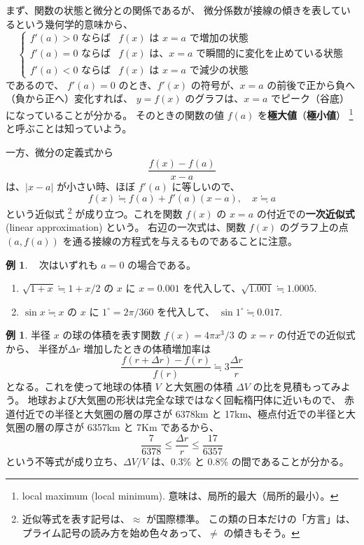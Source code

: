 \documentclass[a4paper]{jsarticle}
\theoremstyle{definition}
\newtheorem{Example}[Theorem]{例}
\theoremstyle{remark}
\begin{document}
まず、関数の状態と微分との関係であるが、
微分係数が接線の傾きを表しているという幾何学的意味から、
\[
\begin{cases}
\text{$f'(a) > 0$ ならば}
&\text{$f(x)$ は $x=a$ で増加の状態}\\
\text{$f'(a) = 0$ ならば}
&\text{$f(x)$ は、$x=a$ で瞬間的に変化を止めている状態}\\
\text{$f'(a) < 0$ ならば}
&\text{$f(x)$ は $x=a$ で減少の状態}
\end{cases}
\]
であるので、
$f'(a) = 0$ のとき、$f'(x)$ の符号が、$x=a$ の前後で正から負へ
（負から正へ）変化すれば、
$y = f(x)$ のグラフは、$x=a$ でピーク（谷底）になっていることが分かる。
そのときの関数の値 $f(a)$ を\textbf{極大値}（\textbf{極小値}）
\footnote{local maximum (local minimum). 意味は、局所的最大（局所的最小）。}と呼ぶことは知っていよう。

一方、微分の定義式から
\[
\frac{f(x) - f(a)}{x-a}
\]
は、$|x-a|$ が小さい時、ほぼ $f'(a)$ に等しいので、
\[
f(x) \fallingdotseq f(a) + f'(a)(x-a), 
\quad 
x \fallingdotseq a
\]
という近似式
\footnote{
近似等式を表す記号は、$\approx$ が国際標準。
この類の日本だけの「方言」は、プライム記号の読み方を始め色々あって、$\not=$ の傾きもそう。}
が成り立つ。これを関数 $f(x)$ の $x=a$ の付近での\textbf{一次近似式}
 (linear approximation) という。
右辺の一次式は、関数 $f(x)$ のグラフ上の点 $(a,f(a))$ を通る接線の方程式を与えるものであることに注意。

\begin{Example}~ 次はいずれも $a=0$ の場合である。
  \begin{enumerate}
  \item 
$\sqrt{1+x} \fallingdotseq 1 + x/2$ の $x$ に $x=0.001$ を代入して、$\sqrt{1.001} \fallingdotseq 1.0005$. 
\item 
$\sin x \fallingdotseq x$ の $x$ に $1^\circ = 2\pi/360$ を代入して、
$\sin 1^\circ \fallingdotseq 0.017$. 
  \end{enumerate}
\end{Example}

\begin{Example}
半径 $x$ の球の体積を表す関数 $f(x) = 4\pi x^3/3$ の $x=r$ の付近での近似式から、
半径が$\Delta r$ 増加したときの体積増加率は
\[
\frac{f(r + \Delta r) - f(r)}{f(r)} \fallingdotseq 3\frac{\Delta r}{r}
\]
となる。これを使って地球の体積 $V$ と大気圏の体積 $\Delta V$ の比を見積もってみよう。
地球および大気圏の形状は完全な球ではなく回転楕円体に近いもので、
赤道付近での半径と大気圏の層の厚さが 6378km と 17km、極点付近での半径と大気圏の層の厚さが
6357km と 7Km であるから、
\[
\frac{7}{6378} \leq \frac{\Delta r}{r} \leq \frac{17}{6357} 
\]
という不等式が成り立ち、$\Delta V/V$ は、0.3\% と 0.8\% の間であることが分かる。
\end{Example}
\end{document}
